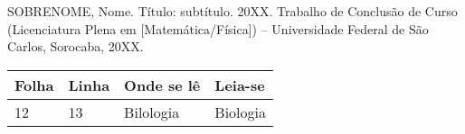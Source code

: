 

\begin{errata}
  SOBRENOME, Nome. Título: subtítulo. 20XX. Trabalho de Conclusão de Curso (Licenciatura Plena em [Matemática/Física]) -- Universidade Federal de São Carlos, Sorocaba, 20XX.
  \vspace*{\onelineskip}

  \begin{table}[ht!]
    \centering
    \footnotesize
    \begin{tabularx}{0.9\textwidth}{p{15mm}p{15mm}XX}
      \toprule
      \textbf{Folha} & \textbf{Linha} & \textbf{Onde se lê} & \textbf{Leia-se} \\
      \midrule
      12 & 13 & Bilologia & Biologia \\
      \bottomrule
    \end{tabularx}
  \end{table}
\end{errata}

\cleardoublepage

